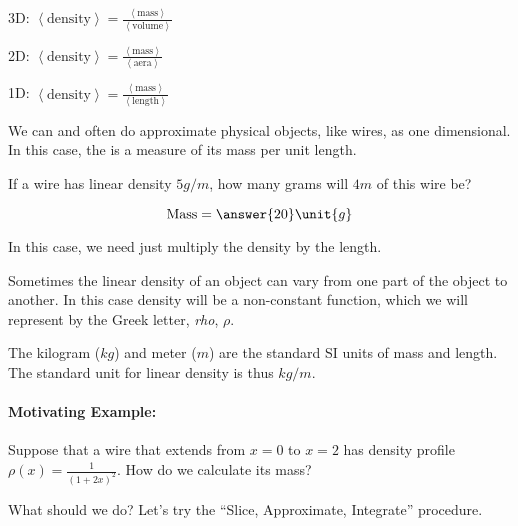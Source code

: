 \documentclass{ximera}
\begin{document}
3D: $\left<\textrm{density}\right> = \frac{\left<\textrm{mass}\right>}{\left<\textrm{volume}\right>}$

2D: $\left<\textrm{density}\right> = \frac{\left<\textrm{mass}\right>}{\left<\textrm{aera}\right>}$

1D: $\left<\textrm{density}\right> = \frac{\left<\textrm{mass}\right>}{\left<\textrm{length}\right>}$

We can and often do approximate physical objects, like wires, as one dimensional.  In this case, the  is a measure of its mass per unit length.

\begin{question}
  If a wire has linear density $5 \unit{g}/\unit{m}$, how many grams
  will $4 \unit{m}$ of this wire be?
  \begin{prompt}
  \[
  \mathrm{Mass} = \answer{20} \unit{g}
  \]
  \end{prompt}
  \begin{hint}
    In this case, we need just multiply the density by the length.
  \end{hint}
\end{question}

Sometimes the linear density of an object can vary from one part of
the object to another. In this case density will be a non-constant function, which we will represent by the Greek letter, \textit{rho}, $\rho$.

\begin{fact}
The kilogram ($kg$) and meter ($m$) are the standard SI units of mass and length.  The standard unit for linear density is thus $kg/m$.
\end{fact}

\paragraph{Motivating Example:} Suppose that a wire that extends from $x=0$ to $x=2$ has density profile $\rho(x) = \frac{1}{(1+2x)^2}$.  How do we calculate its mass?

\begin{multipleChoice}
\end{multipleChoice}

What should we do?  Let's try the ``Slice, Approximate, Integrate'' procedure.
\end{document}
